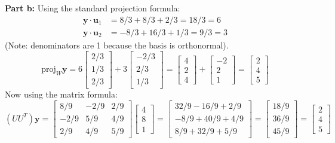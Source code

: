 \documentclass[11pt, letterpaper]{article}
\theoremstyle{definition}
\theoremstyle{remark}
\begin{document}
\textbf{Part b:}
Using the standard projection formula:
\begin{align*}
    \mathbf{y} \cdot \mathbf{u}_1 &= 8/3 + 8/3 + 2/3 = 18/3 = 6 \\
    \mathbf{y} \cdot \mathbf{u}_2 &= -8/3 + 16/3 + 1/3 = 9/3 = 3
\end{align*}
(Note: denominators are 1 because the basis is orthonormal).
\[ \text{proj}_W \mathbf{y} = 6\begin{bmatrix} 2/3 \\ 1/3 \\ 2/3 \end{bmatrix} + 3\begin{bmatrix} -2/3 \\ 2/3 \\ 1/3 \end{bmatrix} = \begin{bmatrix} 4 \\ 2 \\ 4 \end{bmatrix} + \begin{bmatrix} -2 \\ 2 \\ 1 \end{bmatrix} = \begin{bmatrix} 2 \\ 4 \\ 5 \end{bmatrix} \]
Now using the matrix formula:
\[ (U U^T)\mathbf{y} = \begin{bmatrix} 8/9 & -2/9 & 2/9 \\ -2/9 & 5/9 & 4/9 \\ 2/9 & 4/9 & 5/9 \end{bmatrix} \begin{bmatrix} 4 \\ 8 \\ 1 \end{bmatrix} = \begin{bmatrix} 32/9 - 16/9 + 2/9 \\ -8/9 + 40/9 + 4/9 \\ 8/9 + 32/9 + 5/9 \end{bmatrix} = \begin{bmatrix} 18/9 \\ 36/9 \\ 45/9 \end{bmatrix} = \begin{bmatrix} 2 \\ 4 \\ 5 \end{bmatrix} \]
\end{document}
